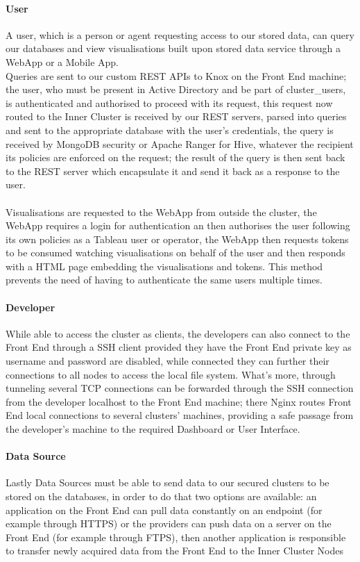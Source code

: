 \paragraph{User}
A user, which is a person or agent requesting access to our stored data, can query our databases and view visualisations built upon stored data service through a WebApp or a Mobile App.\\
Queries are sent to our custom REST APIs to Knox on the Front End machine; the user, who must be present in Active Directory and be part of cluster\_users, is authenticated and authorised to proceed with its request, this request now routed to the Inner Cluster is received by our REST servers, parsed into queries and sent to the appropriate database with the user's credentials, the query is received by MongoDB security or Apache Ranger for Hive, whatever the recipient its policies are enforced on the request; the result of the query is then sent back to the REST server which encapsulate it and send it back as a response to the user.
\\ \\
Visualisations are requested to the WebApp from outside the cluster, the WebApp requires a login for authentication an then authorises the user following its own policies as a Tableau user or operator, the WebApp then requests tokens to be consumed watching visualisations on behalf of the user and then responds with a HTML page embedding the visualisations and tokens. This method prevents the need of having to authenticate the same users multiple times.
\paragraph{Developer}
While able to access the cluster as clients, the developers can also connect to the Front End through a SSH client provided they have the Front End private key as username and password are disabled, while connected they can further their connections to all nodes to access the local file system. What's more, through tunneling several TCP connections can be forwarded through the SSH connection from the developer localhost to the Front End machine; there Nginx routes Front End local connections to several clusters' machines, providing a safe passage from the developer's machine to the required Dashboard or User Interface.
\paragraph{Data Source}
Lastly Data Sources must be able to send data to our secured clusters to be stored on the databases, in order to do that two options are available: an application on the Front End can pull data constantly on an endpoint (for example through HTTPS) or the providers can push data on a server on the Front End (for example through FTPS), then another application is responsible to transfer newly acquired data from the Front End to the Inner Cluster Nodes